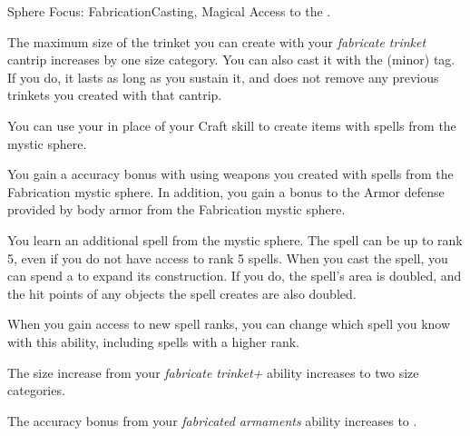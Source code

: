   \begin{magicalfeat}{Sphere Focus: Fabrication}{Casting, Magical}
    \featpre Access to the  .

     The maximum size of the trinket you can create with your \textit{fabricate trinket} cantrip increases by one size category.
    You can also cast it with the  (minor) tag.
    If you do, it lasts as long as you sustain it, and does not remove any previous trinkets you created with that cantrip.

     You can use your  in place of your Craft skill to create items with spells from the  mystic sphere.

     You gain a  accuracy bonus with  using weapons you created with spells from the Fabrication mystic sphere.
    In addition, you gain a  bonus to the Armor defense provided by body armor from the Fabrication mystic sphere.

     You learn an additional spell from the  mystic sphere.
    The spell can be up to rank 5, even if you do not have access to rank 5 spells.
    When you cast the spell, you can spend a  to expand its construction.
    If you do, the spell's area is doubled, and the hit points of any objects the spell creates are also doubled.

    When you gain access to new spell ranks, you can change which spell you know with this ability, including spells with a higher rank.

     The size increase from your \textit{fabricate trinket+} ability increases to two size categories.

     The accuracy bonus from your \textit{fabricated armaments} ability increases to .
  \end{magicalfeat}

